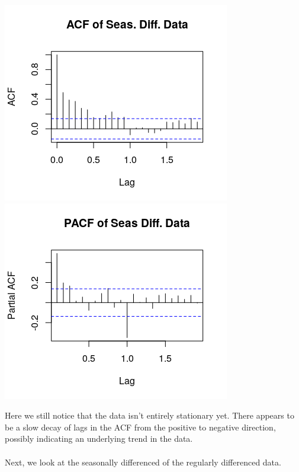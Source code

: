 \documentclass[11pt]{article}
\begin{document}
\begin{center}
\includegraphics[scale=.8]{1b2}
\includegraphics[scale=.8]{1b2a}
\end{center}
Here we still notice that the data isn't entirely stationary yet. There appears to be a slow decay of lags in the ACF from the positive to negative direction, possibly indicating an underlying trend in the data.
\\\\
Next, we look at the seasonally differenced of the regularly differenced data.
\end{document}

